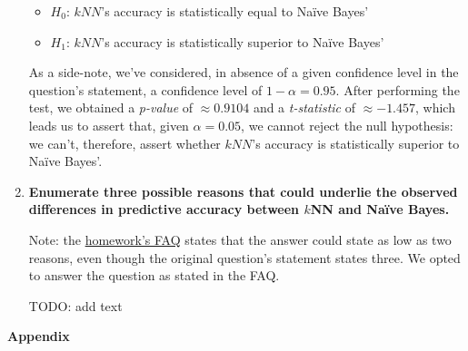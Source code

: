 \documentclass[12pt]{article}
\begin{document}
\begin{enumerate}[leftmargin=\labelsep,resume]
  \begin{itemize}
    \item $H_0$: $kNN$'s accuracy is statistically equal to Naïve Bayes'
    \item $H_1$: $kNN$'s accuracy is statistically superior to Naïve Bayes'
  \end{itemize}

  As a side-note, we've considered, in absence of a given confidence level in the
  question's statement, a confidence level of $1 - \alpha = 0.95$.
  After performing the test, we obtained a \textit{p-value} of $\approx 0.9104$ and
  a \textit{t-statistic} of $\approx -1.457$, which leads us to assert that, given
  $\alpha = 0.05$, we cannot reject the null hypothesis: we can't, therefore,
  assert whether $kNN$'s accuracy is statistically superior to Naïve Bayes'.

  \pagebreak
   
  \item \textbf{Enumerate three possible reasons that could underlie the observed differences in predictive
  accuracy between $k$NN and Naïve Bayes.}

  Note: the \href{https://fenix.tecnico.ulisboa.pt/disciplinas/Apre2/2022-2023/1-semestre/homeworks}{homework's FAQ}
  states that the answer could state as low as two reasons, even though the original
  question's statement states three. We opted to answer the question as stated in
  the FAQ.

  TODO: add text
  
\end{enumerate}

\pagebreak

\large{\textbf{Appendix}\vskip 0.3cm}


\end{document}
